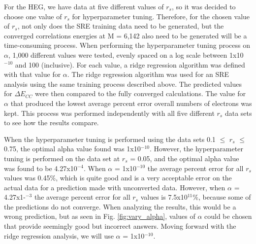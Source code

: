 For the HEG, we have data at five different values of $r_s$, so it was decided to choose one value of $r_s$ for hyperparameter tuning. Therefore, for the chosen value of $r_s$, not only does the SRE training data need to be generated, but the converged correlations energies at M = 6,142 also need to be generated will be a time-consuming process. When performing the hyperparameter tuning process on $\alpha$, 1,000 different values were tested, evenly spaced on a log scale between 1x10$^{-10}$ and 100 (inclusive). For each value, a ridge regression algorithm was defined with that value for $\alpha$. The ridge regression algorithm was used for an SRE analysis using the same training process described above. The predicted values for $\Delta E_{CC}$ were then compared to the fully converged calculations. The value for $\alpha$ that produced the lowest average percent error overall numbers of electrons was kept. This process was performed independently with all five different $r_s$ data sets to see how the results compare. 

When the hyperparameter tuning is performed using the data sets 0.1 $\leq$ $r_s$ $\leq$ 0.75, the optimal alpha value found was 1x10$^{-10}$. However, the hyperparameter tuning is performed on the data set at $r_s$ = 0.05, and the optimal alpha value was found to be 4.27x10$^{-4}$. When $\alpha$ = 1x10$^{-10}$ the average percent error for all $r_s$ values was 0.45$\%$, which is quite good and is a very acceptable error on the actual data for a prediction made with unconverted data. However, when $\alpha$ = 4.27x1-$^{-3}$ the average percent error for all $r_s$ values is 7.5x10$^{11}$$\%$, because some of the predictions do not converge.  When analyzing the results, this would be a wrong prediction, but as seen in Fig. \ref{fig:vary_alpha}, values of $\alpha$ could be chosen that provide seemingly good but incorrect answers. Moving forward with the ridge regression analysis, we will use $\alpha$ = 1x10$^{-10}$.

